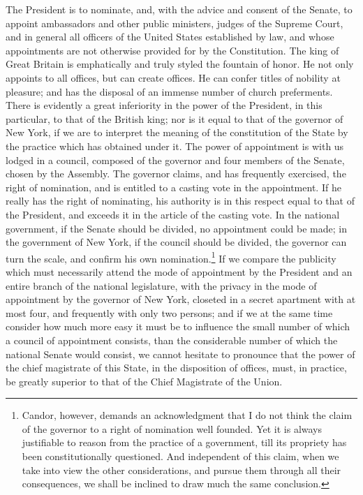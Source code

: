The President is to nominate, and, with the advice and consent of the Senate, to appoint ambassadors and other public ministers, judges of the Supreme Court, and in general all officers of the United States established by law, and whose appointments are not otherwise provided for by the Constitution. 
The king of Great Britain is emphatically and truly styled the fountain of honor. 
He not only appoints to all offices, but can create offices. 
He can confer titles of nobility at pleasure; and has the disposal of an immense number of church preferments. 
There is evidently a great inferiority in the power of the President, in this particular, to that of the British king; nor is it equal to that of the governor of New York, if we are to interpret the meaning of the constitution of the State by the practice which has obtained under it. 
The power of appointment is with us lodged in a council, composed of the governor and four members of the Senate, chosen by the Assembly. 
The governor claims, and has frequently exercised, the right of nomination, and is entitled to a casting vote in the appointment. 
If he really has the right of nominating, his authority is in this respect equal to that of the President, and exceeds it in the article of the casting vote. 
In the national government, if the Senate should be divided, no appointment could be made; in the government of New York, if the council should be divided, the governor can turn the scale, and confirm his own nomination.\footnote{Candor, however, demands an acknowledgment that I do not think the claim of the governor to a right of nomination well founded. 
Yet it is always justifiable to reason from the practice of a government, till its propriety has been constitutionally questioned. 
And independent of this claim, when we take into view the other considerations, and pursue them through all their consequences, we shall be inclined to draw much the same conclusion.} If we compare the publicity which must necessarily attend the mode of appointment by the President and an entire branch of the national legislature, with the privacy in the mode of appointment by the governor of New York, closeted in a secret apartment with at most four, and frequently with only two persons; and if we at the same time consider how much more easy it must be to influence the small number of which a council of appointment consists, than the considerable number of which the national Senate would consist, we cannot hesitate to pronounce that the power of the chief magistrate of this State, in the disposition of offices, must, in practice, be greatly superior to that of the Chief Magistrate of the Union.


